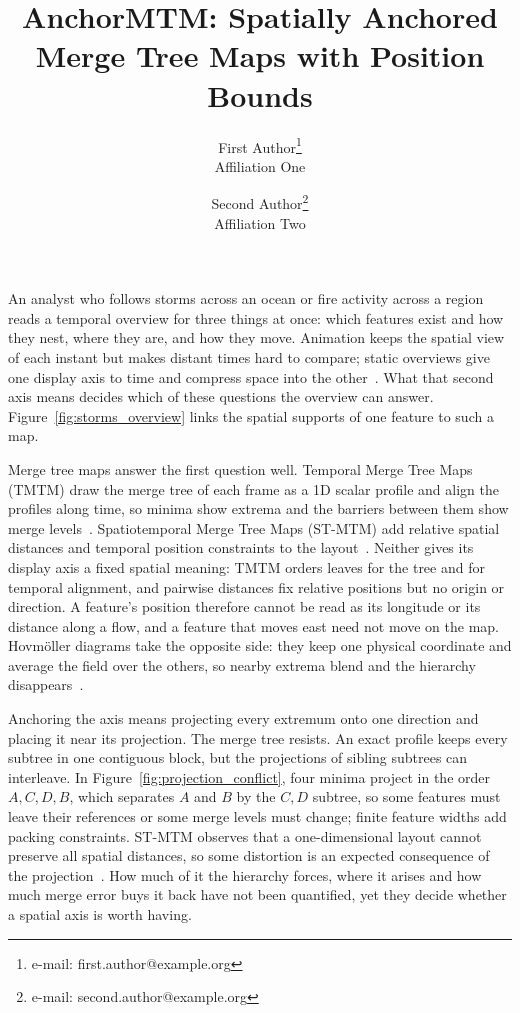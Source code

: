 \documentclass{vgtc}                %
\title{AnchorMTM: Spatially Anchored Merge Tree Maps with Position Bounds}
\author{First Author\thanks{e-mail: first.author@example.org}\\ %
        \scriptsize Affiliation One %
\and Second Author\thanks{e-mail: second.author@example.org}\\ %
     \scriptsize Affiliation Two}
\begin{document}
\maketitle
\raggedbottom
\setlength{\emergencystretch}{1.5em}
An analyst who follows storms across an ocean or fire activity across a region reads a temporal overview for three things at once: which features exist and how they nest, where they are, and how they move. Animation keeps the spatial view of each instant but makes distant times hard to compare; static overviews give one display axis to time and compress space into the other~\cite{Tversky:2002:Animation,Robertson:2008:Animation,Bach:2017:STC}. What that second axis means decides which of these questions the overview can answer. Figure~\ref{fig:storms_overview} links the spatial supports of one feature to such a map.

Merge tree maps answer the first question well. Temporal Merge Tree Maps (TMTM) draw the merge tree of each frame as a 1D scalar profile and align the profiles along time, so minima show extrema and the barriers between them show merge levels~\cite{Koepp:2023:TMTM}. Spatiotemporal Merge Tree Maps (ST-MTM) add relative spatial distances and temporal position constraints to the layout~\cite{STMTM:2026}. Neither gives its display axis a fixed spatial meaning: TMTM orders leaves for the tree and for temporal alignment, and pairwise distances fix relative positions but no origin or direction. A feature's position therefore cannot be read as its longitude or its distance along a flow, and a feature that moves east need not move on the map. Hovm\"oller diagrams take the opposite side: they keep one physical coordinate and average the field over the others, so nearby extrema blend and the hierarchy disappears~\cite{Hovmoller:1949}.

Anchoring the axis means projecting every extremum onto one direction and placing it near its projection. The merge tree resists. An exact profile keeps every subtree in one contiguous block, but the projections of sibling subtrees can interleave. In Figure~\ref{fig:projection_conflict}, four minima project in the order $A,C,D,B$, which separates $A$ and $B$ by the $C,D$ subtree, so some features must leave their references or some merge levels must change; finite feature widths add packing constraints. ST-MTM observes that a one-dimensional layout cannot preserve all spatial distances, so some distortion is an expected consequence of the projection~\cite{STMTM:2026}. How much of it the hierarchy forces, where it arises and how much merge error buys it back have not been quantified, yet they decide whether a spatial axis is worth having.
\end{document}
